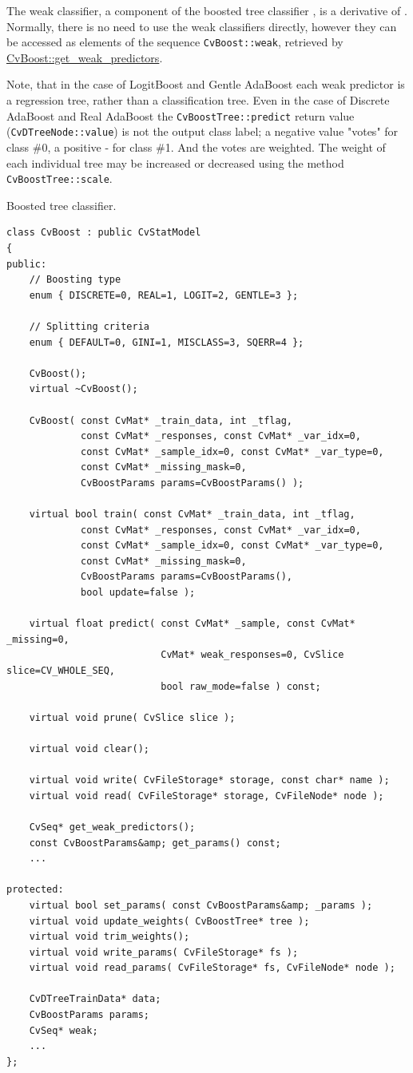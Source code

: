 The weak classifier, a component of the boosted tree classifier , is a derivative of . Normally, there is no need to use the weak classifiers directly, however they can be accessed as elements of the sequence \texttt{CvBoost::weak}, retrieved by \href{#CvBoost.3A.3Agetweakpredictors}{CvBoost::get\_weak\_predictors}.

Note, that in the case of LogitBoost and Gentle AdaBoost each weak predictor is a regression tree, rather than a classification tree. Even in the case of Discrete AdaBoost and Real AdaBoost the \texttt{CvBoostTree::predict} return value (\texttt{CvDTreeNode::value}) is not the output class label; a negative value "votes" for class \#0, a positive - for class \#1. And the votes are weighted. The weight of each individual tree may be increased or decreased using the method \texttt{CvBoostTree::scale}.



Boosted tree classifier.

\begin{lstlisting}
class CvBoost : public CvStatModel
{
public:
    // Boosting type
    enum { DISCRETE=0, REAL=1, LOGIT=2, GENTLE=3 };

    // Splitting criteria
    enum { DEFAULT=0, GINI=1, MISCLASS=3, SQERR=4 };

    CvBoost();
    virtual ~CvBoost();

    CvBoost( const CvMat* _train_data, int _tflag,
             const CvMat* _responses, const CvMat* _var_idx=0,
             const CvMat* _sample_idx=0, const CvMat* _var_type=0,
             const CvMat* _missing_mask=0,
             CvBoostParams params=CvBoostParams() );

    virtual bool train( const CvMat* _train_data, int _tflag,
             const CvMat* _responses, const CvMat* _var_idx=0,
             const CvMat* _sample_idx=0, const CvMat* _var_type=0,
             const CvMat* _missing_mask=0,
             CvBoostParams params=CvBoostParams(),
             bool update=false );

    virtual float predict( const CvMat* _sample, const CvMat* _missing=0,
                           CvMat* weak_responses=0, CvSlice slice=CV_WHOLE_SEQ,
                           bool raw_mode=false ) const;

    virtual void prune( CvSlice slice );

    virtual void clear();

    virtual void write( CvFileStorage* storage, const char* name );
    virtual void read( CvFileStorage* storage, CvFileNode* node );

    CvSeq* get_weak_predictors();
    const CvBoostParams&amp; get_params() const;
    ...

protected:
    virtual bool set_params( const CvBoostParams&amp; _params );
    virtual void update_weights( CvBoostTree* tree );
    virtual void trim_weights();
    virtual void write_params( CvFileStorage* fs );
    virtual void read_params( CvFileStorage* fs, CvFileNode* node );

    CvDTreeTrainData* data;
    CvBoostParams params;
    CvSeq* weak;
    ...
};
\end{lstlisting}


